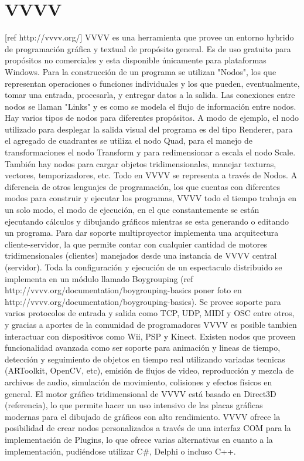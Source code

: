 \section{VVVV}
[ref http://vvvv.org/]
VVVV es una herramienta que provee un entorno hybrido de programación gráfica y textual de propósito general. Es de uso gratuito para propósitos no comerciales y esta disponible únicamente para plataformas Windows.
Para la construcción de un programa se utilizan "Nodos", los que representan operaciones o funciones individuales y los que pueden, eventualmente, tomar una entrada, procesarla, y entregar datos a la salida. Las conexiones entre nodos se llaman "Links" y es como se modela el flujo de información entre nodos. Hay varios tipos de nodos para diferentes propósitos. A modo de ejemplo, el nodo utilizado para desplegar la salida visual del programa es del tipo Renderer, para el agregado de cuadrantes se utiliza el nodo Quad, para el manejo de transformaciones el nodo Transform y para redimensionar a escala el nodo Scale. También hay nodos para cargar objetos tridimensionales, manejar texturas, vectores, temporizadores, etc. Todo en VVVV se representa a través de Nodos.
A diferencia de otros lenguajes de programación, los que cuentas con diferentes modos para construir y ejecutar los programas, VVVV todo el tiempo trabaja en un solo modo, el modo de ejecución, en el que constantemente se están ejecutando cálculos y dibujando gráficos mientras se esta generando o editando un programa.
Para dar soporte multiproyector implementa una arquitectura cliente-servidor, la que permite contar con cualquier cantidad de motores tridimensionales (clientes) manejados desde una instancia de VVVV central (servidor). Toda la configuración y ejecución de un espectaculo distribuido se implementa en un módulo llamado Boygrouping (ref http://vvvv.org/documentation/boygrouping-basics poner foto en http://vvvv.org/documentation/boygrouping-basics).
Se provee soporte para varios protocolos de entrada y salida como TCP, UDP, MIDI y OSC entre otros, y gracias a aportes de la comunidad de programadores VVVV es posible tambien interactuar con dispositivos como Wii, PSP y Kinect. Existen nodos que proveen funcionalidad avanzada como ser soporte para animación y lineas de tiempo, detección y seguimiento de objetos en tiempo real utilizando variadas tecnicas (ARToolkit, OpenCV, etc), emisión de flujos de video, reproducción y mezcla de archivos de audio, simulación de movimiento, colisiones y efectos físicos en general.
El motor gráfico tridimensional de VVVV está basado en Direct3D (referencia), lo que permite hacer un uso intensivo de las placas gráficas modernas para el dibujado de gráficos con alto rendimiento.
VVVV ofrece la posibilidad de crear nodos personalizados a través de una interfaz COM para la implementación de Plugins, lo que ofrece varias alternativas en cuanto a la implementación, pudiéndose utilizar C\#, Delphi o incluso C++.
